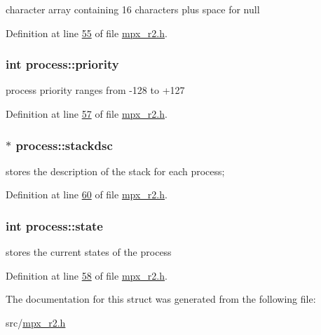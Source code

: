 character array containing 16 characters plus space for null 



Definition at line \hyperlink{mpx__r2_8h_source_l00055}{55} of file \hyperlink{mpx__r2_8h_source}{mpx\_\-r2.h}.

\hypertarget{structprocess_a0d71749eff1f19063bfad58c4bf7ba64}{
\subsubsection[{priority}]{\setlength{\rightskip}{0pt plus 5cm}int {\bf process::priority}}}
\label{structprocess_a0d71749eff1f19063bfad58c4bf7ba64}


process priority ranges from -\/128 to +127 



Definition at line \hyperlink{mpx__r2_8h_source_l00057}{57} of file \hyperlink{mpx__r2_8h_source}{mpx\_\-r2.h}.

\hypertarget{structprocess_a7e0fb37fbb9c155b18f75a94a8fc202b}{
\subsubsection[{stackdsc}]{$\ast$ {\bf process::stackdsc}}}
\label{structprocess_a7e0fb37fbb9c155b18f75a94a8fc202b}


stores the description of the stack for each process; 



Definition at line \hyperlink{mpx__r2_8h_source_l00060}{60} of file \hyperlink{mpx__r2_8h_source}{mpx\_\-r2.h}.

\hypertarget{structprocess_a65d9093ba530e1d4e0a67f94d8a60345}{
\subsubsection[{state}]{\setlength{\rightskip}{0pt plus 5cm}int {\bf process::state}}}
\label{structprocess_a65d9093ba530e1d4e0a67f94d8a60345}


stores the current states of the process 



Definition at line \hyperlink{mpx__r2_8h_source_l00058}{58} of file \hyperlink{mpx__r2_8h_source}{mpx\_\-r2.h}.



The documentation for this struct was generated from the following file:\begin{DoxyCompactItemize}
\item 
src/\hyperlink{mpx__r2_8h}{mpx\_\-r2.h}\end{DoxyCompactItemize}
